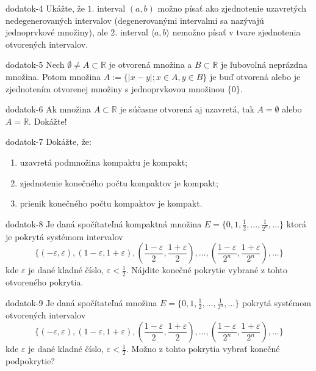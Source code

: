 \begin{defproblem}{dodatok-4}
Ukážte, že $1.$ interval $(a,b)$ možno písať ako zjednotenie uzavretých nedegenerovaných intervalov (degenerovanými intervalmi sa nazývajú jednoprvkové množiny), ale $2.$ interval $\langle a,b \rangle$ nemožno písať v tvare zjednotenia otvorených intervalov.
\end{defproblem}

\begin{defproblem}{dodatok-5}
Nech $\emptyset \neq A \subset \mathbb{R}$ je otvorená množina a $B \subset \mathbb{R}$ je ľubovoľná neprázdna množina. Potom množina $A:=\{|x-y|; x \in A, y \in B\}$ je buď otvorená alebo je zjednotením otvorenej množiny s jednoprvkovou množinou $\{0 \}$.
\end{defproblem}

\begin{defproblem}{dodatok-6}
Ak množina $A \subset \mathbb{R}$ je súčasne otvorená aj uzavretá, tak $A=\emptyset$ alebo $A=\mathbb{R}$. Dokážte!
\end{defproblem}

\begin{defproblem}{dodatok-7}
Dokážte, že:
\begin{enumerate}
\item uzavretá podmnožina kompaktu je kompakt;
\item zjednotenie konečného počtu kompaktov je kompakt;
\item prienik konečného počtu kompaktov je kompakt.
\end{enumerate}
\end{defproblem}

\begin{defproblem}{dodatok-8}
Je daná spočítateľná kompaktná množina
$E=\{0,1,\frac{1}{2},...,\frac{1}{2^n},...\}$
ktorá je pokrytá systémom intervalov
$$
\{
    (-\varepsilon, \varepsilon),
    (1-\varepsilon,1+\varepsilon),
    (\frac{1-\varepsilon}{2},\frac{1+\varepsilon}{2}),
    ...,
    (\frac{1-\varepsilon}{2^n},
    \frac{1+\varepsilon}{2^n}),
    ...
\}
$$
kde $\varepsilon$ je dané kladné číslo, $\varepsilon<\frac{1}{2}$. Nájdite
konečné pokrytie vybrané z tohto otvoreného pokrytia.
\end{defproblem}

\begin{defproblem}{dodatok-9}
Je daná spočítateľná množina
$E=\{0,1,\frac{1}{2},...,\frac{1}{2^n},... \}$
pokrytá systémom otvorených intervalov
$$
\{
    (-\varepsilon, \varepsilon),
    (1-\varepsilon,1+\varepsilon),
    (\frac{1-\varepsilon}{2},\frac{1+\varepsilon}{2}),
    ...,
    (\frac{1-\varepsilon}{2^n},\frac{1+\varepsilon}{2^n}),
    ...
\}
$$
kde $\varepsilon$ je dané kladné číslo, $\varepsilon<\frac{1}{2}$. Možno z tohto
pokrytia vybrať konečné podpokrytie?
\end{defproblem}

